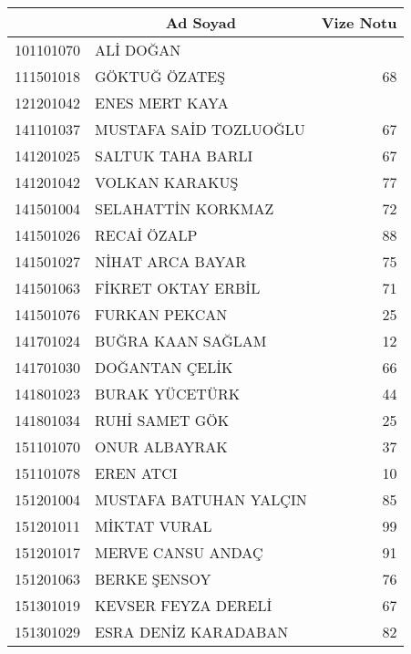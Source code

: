 \documentclass[12pt]{article}
\begin{document}

  
    \begin{longtable}{||r||l||r||}
    \toprule
    \toprule
    \rowcolor[rgb]{ 1,  .8,  1} \multicolumn{1}{||c||}{\textbf{Öğrenci No}} & \multicolumn{1}{c||}{\textbf{Ad Soyad}} & \multicolumn{1}{c||}{\textbf{Vize Notu}} \\
    \midrule
    \midrule
\endhead    
    101101070 & ALİ DOĞAN &  \\
    \midrule
    111501018 & GÖKTUĞ ÖZATEŞ & 68 \\
    \midrule
    121201042 & ENES MERT KAYA &  \\
    \midrule
    141101037 & MUSTAFA SAİD TOZLUOĞLU & 67 \\
    \midrule
    141201025 & SALTUK TAHA BARLI & 67 \\
    \midrule
    141201042 & VOLKAN KARAKUŞ & 77 \\
    \midrule
    141501004 & SELAHATTİN KORKMAZ & 72 \\
    \midrule
    141501026 & RECAİ ÖZALP & 88 \\
    \midrule
    141501027 & NİHAT ARCA BAYAR & 75 \\
    \midrule
    141501063 & FİKRET OKTAY ERBİL & 71 \\
    \midrule
    141501076 & FURKAN PEKCAN & 25 \\
    \midrule
    141701024 & BUĞRA KAAN SAĞLAM & 12 \\
    \midrule
    141701030 & DOĞANTAN ÇELİK & 66 \\
    \midrule
    141801023 & BURAK YÜCETÜRK & 44 \\
    \midrule
    141801034 & RUHİ SAMET GÖK & 25 \\
    \midrule
    151101070 & ONUR ALBAYRAK & 37 \\
    \midrule
    151101078 & EREN ATCI & 10 \\
    \midrule
    151201004 & MUSTAFA BATUHAN YALÇIN & 85 \\
    \midrule
    151201011 & MİKTAT VURAL & 99 \\
    \midrule
    151201017 & MERVE CANSU ANDAÇ & 91 \\
    \midrule
    151201063 & BERKE ŞENSOY & 76 \\
    \midrule
    151301019 & KEVSER FEYZA DERELİ & 67 \\
    \midrule
    151301029 & ESRA DENİZ KARADABAN & 82 \\

\end{longtable}
\end{document}
